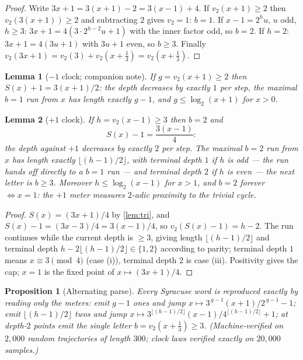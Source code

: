 \documentclass[11pt]{article}
\newtheorem{lemma}{Lemma}
\newtheorem{proposition}{Proposition}
\newcommand{\vt}{v_2}
\begin{document}
\begin{proof}
Write $3x+1=3(x+1)-2=3(x-1)+4$. If $\vt(x+1)\ge2$ then
$\vt(3(x+1))\ge2$ and subtracting $2$ gives $\vt=1$: $b=1$. If
$x-1=2^hu$, $u$ odd, $h\ge3$: $3x+1=4(3\cdot2^{h-2}u+1)$ with the inner
factor odd, so $b=2$. If $h=2$: $3x+1=4(3u+1)$ with $3u+1$ even, so
$b\ge3$. Finally $\vt(3x+1)=\vt(3)+\vt(x+\tfrac13)=\vt(x+\tfrac13)$.
\end{proof}

\begin{lemma}[$-1$ clock; companion note]\label{lem:minus}
If $g=\vt(x+1)\ge2$ then $S(x)+1=3(x+1)/2$: the depth decreases by
exactly $1$ per step, the maximal $b{=}1$ run from $x$ has length
exactly $g-1$, and $g\le\log_2(x+1)$ for $x>0$.
\end{lemma}

\begin{lemma}[$+1$ clock]\label{lem:plus}
If $h=\vt(x-1)\ge3$ then $b=2$ and
\[
S(x)-1=\frac{3(x-1)}{4}:
\]
the depth against $+1$ decreases by exactly $2$ per step. The maximal
$b{=}2$ run from $x$ has length exactly $\lfloor(h-1)/2\rfloor$, with
terminal depth $1$ if $h$ is odd --- the run hands off directly to a
$b{=}1$ run --- and terminal depth $2$ if $h$ is even --- the next letter
is $b\ge3$. Moreover $h\le\log_2(x-1)$ for $x>1$, and $b{=}2$ forever
$\iff x=1$: \emph{the $+1$ meter measures $2$-adic proximity to the
trivial cycle}.
\end{lemma}

\begin{proof}
$S(x)=(3x+1)/4$ by \cref{lem:tri}, and $S(x)-1=(3x-3)/4=3(x-1)/4$, so
$\vt(S(x)-1)=h-2$. The run continues while the current depth is $\ge3$,
giving length $\lfloor(h-1)/2\rfloor$ and terminal depth
$h-2\lfloor(h-1)/2\rfloor\in\{1,2\}$ according to parity; terminal
depth $1$ means $x\equiv3\pmod4$ (case (i)), terminal depth $2$ is case
(iii). Positivity gives the cap; $x=1$ is the fixed point of
$x\mapsto(3x+1)/4$.
\end{proof}

\begin{proposition}[Alternating parse]\label{prop:parse}
Every Syracuse word is reproduced exactly by reading only the meters:
emit $g-1$ ones and jump $x\mapsto3^{\,g-1}(x+1)/2^{\,g-1}-1$; emit
$\lfloor(h-1)/2\rfloor$ twos and jump
$x\mapsto3^{\lfloor(h-1)/2\rfloor}(x-1)/4^{\lfloor(h-1)/2\rfloor}+1$;
at depth-$2$ points emit the single letter $b=\vt(x+\tfrac13)\ge3$.
(Machine-verified on $2{,}000$ random trajectories of length $300$;
clock laws verified exactly on $20{,}000$ samples.)
\end{proposition}
\end{document}
